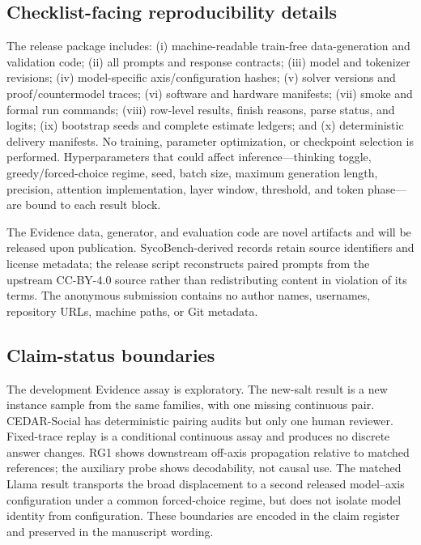 \documentclass[letterpaper]{article}
\begin{document}
\subsection{Checklist-facing reproducibility details}

The release package includes: (i) machine-readable train-free data-generation and validation code; (ii) all prompts and response contracts; (iii) model and tokenizer revisions; (iv) model-specific axis/configuration hashes; (v) solver versions and proof/countermodel traces; (vi) software and hardware manifests; (vii) smoke and formal run commands; (viii) row-level results, finish reasons, parse status, and logits; (ix) bootstrap seeds and complete estimate ledgers; and (x) deterministic delivery manifests.  No training, parameter optimization, or checkpoint selection is performed.  Hyperparameters that could affect inference---thinking toggle, greedy/forced-choice regime, seed, batch size, maximum generation length, precision, attention implementation, layer window, threshold, and token phase---are bound to each result block.

The Evidence data, generator, and evaluation code are novel artifacts and will be released upon publication.  SycoBench-derived records retain source identifiers and license metadata; the release script reconstructs paired prompts from the upstream CC-BY-4.0 source rather than redistributing content in violation of its terms.  The anonymous submission contains no author names, usernames, repository URLs, machine paths, or Git metadata.

\subsection{Claim-status boundaries}

The development Evidence assay is exploratory.  The new-salt result is a new instance sample from the same families, with one missing continuous pair.  CEDAR-Social has deterministic pairing audits but only one human reviewer.  Fixed-trace replay is a conditional continuous assay and produces no discrete answer changes.  RG1 shows downstream off-axis propagation relative to matched references; the auxiliary probe shows decodability, not causal use.  The matched Llama result transports the broad displacement to a second released model--axis configuration under a common forced-choice regime, but does not isolate model identity from configuration.  These boundaries are encoded in the claim register and preserved in the manuscript wording.


\end{document}
